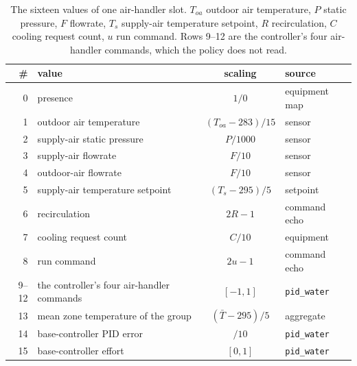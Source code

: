 \documentclass{article}
\begin{document}
\begin{table}[h!]
\centering
\small
\begin{tabular}{@{}rlcl@{}}
\toprule
\# & value & scaling & source \\
\midrule
0 & presence & $1/0$ & equipment map \\
1 & outdoor air temperature & $(T_{oa}-283)/15$ & sensor \\
2 & supply-air static pressure & $P/1000$ & sensor \\
3 & supply-air flowrate & $F/10$ & sensor \\
4 & outdoor-air flowrate & $F/10$ & sensor \\
5 & supply-air temperature setpoint & $(T_s-295)/5$ & setpoint \\
6 & recirculation & $2R-1$ & command echo \\
7 & cooling request count & $C/10$ & equipment \\
8 & run command & $2u-1$ & command echo \\
9--12 & the controller's four air-handler commands & $[-1,1]$ & \texttt{pid\_water} \\
13 & mean zone temperature of the group & $(\bar T-295)/5$ & aggregate \\
14 & base-controller PID error & $/10$ & \texttt{pid\_water} \\
15 & base-controller effort & $[0,1]$ & \texttt{pid\_water} \\
\bottomrule
\end{tabular}
\vspace{4pt}
\caption{The sixteen values of one air-handler slot. $T_{oa}$ outdoor air temperature, $P$ static pressure, $F$ flowrate, $T_s$ supply-air temperature setpoint, $R$ recirculation, $C$ cooling request count, $u$ run command. Rows 9--12 are the controller's four air-handler commands, which the policy does not read.}
\label{tab:app_ahu}
\end{table}
\end{document}
